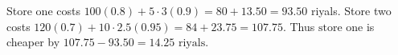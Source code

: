 Store one costs $100(0.8)+5\cdot3(0.9)=80+13.50=93.50$ riyals. Store two costs $120(0.7)+10\cdot2.5(0.95)=84+23.75=107.75$. Thus $\boxed{\text{store one}}$ is cheaper by $107.75-93.50=\boxed{14.25\text{ riyals}}$.
